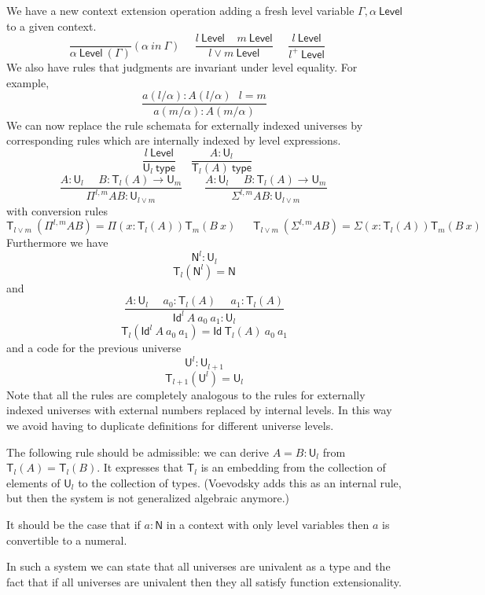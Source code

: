 \documentclass[11pt,a4paper]{article}
\newcommand{\Id}{\mathsf{Id}}
\def\NN{\mathsf{N}}
\def\UU{\mathsf{U}}
\def\Level{\mathsf{Level}}
\newcommand{\type}{\mathsf{type}}
\newcommand{\T}{\mathsf{T}}
\begin{document}
We have a new context extension operation adding a fresh level variable $\Gamma,\alpha~\Level$
to a given context.
$$
\frac{}{\alpha~\Level~(\Gamma)}(\alpha~in~\Gamma)~~~~~~
\frac{l~\Level~~~~~m~\Level}{l\vee m~\Level}~~~~~~
\frac{l~\Level}{l^+~\Level}~~~~~~
$$
We also have rules that judgments are invariant under level equality. For example,
$$
\frac{a(l/\alpha) : A(l/\alpha)\ \ \ l = m}
{a(m/\alpha) : A(m/\alpha)}
$$
We can now replace the rule schemata for externally indexed universes by corresponding rules which are internally indexed by level expressions.
$$
\frac{l~\Level}{\UU_{l}~\type}~~~~~~
\frac{A:\UU_{l}}{\T_{l}(A)~\type}~~~~~~
$$
$$
\frac{A:\UU_{l}~~~~~~B:\T_{l}(A)\rightarrow \UU_{m}}
     {\Pi^{l,m} A B:\UU_{l\vee m}}~~~~~~~~~
\frac{A:\UU_{l}~~~~~~B:\T_{l}(A)\rightarrow \UU_{m}}
     {\Sigma^{l,m} A B:\UU_{l\vee m}}~~~~~~~~~
$$
with conversion rules
$$
\T_{l\vee m}~(\Pi^{l,m} A B) = \Pi (x:\T_{l}(A)) \T_{m}(B~x)~~~~~~~
\T_{l\vee m}~(\Sigma^{l,m} A B) = \Sigma (x:\T_{l}(A)) \T_{m}(B~x)~~~~~~~
$$
Furthermore we have $$\NN^{l}:\UU_{l}$$
$$\T_{l}(\NN^{l}) = \NN$$
and
$$
\frac{A:\UU_l~~~~~~a_0:\T_l(A)~~~~~~a_1:\T_l(A)}
{\Id^l~A~a_0~a_1:\UU_l}
$$
$$\T_l(\Id^l~A~a_0~a_1) = \Id~\T_l(A)~a_0~a_1$$
and a code for the previous universe
$${\UU^{l}}:\UU_{l + 1}$$
$$\T_{l + 1}({\UU^{l}}) = \UU_{l}$$
Note that all the rules are completely analogous to the rules for externally indexed universes with external numbers replaced by internal levels. In this way we avoid having to duplicate definitions for different universe levels.
%
%
%
%
%
%
%

The following rule should be admissible:
we can derive $A = B : \UU_l$ from $\T_l(A) = \T_l(B)$.
 It expresses that $\T_l$ is an embedding from the collection of elements of $\UU_l$
 to the collection of types.
 (Voevodsky \cite[Rule 20 on p. 17]{VV} adds this as an internal rule, but then the system is not
 generalized algebraic anymore.)

It should be the case that if $a :\NN$ in a context with only level variables
then $a$ is convertible to a numeral.

In such a system we can state that all universes are univalent as a type and the
fact that if all universes are univalent then they all satisfy function extensionality.
\end{document}
